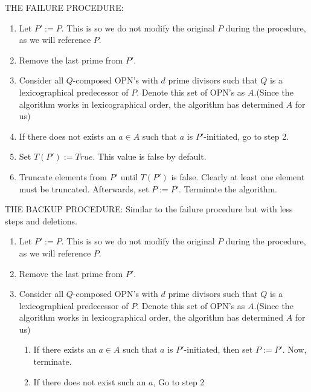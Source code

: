 \documentclass[../paper.tex]{subfiles}
\begin{document}
THE FAILURE PROCEDURE:

\begin{enumerate}[label*=\arabic*.]

  \item Let $P' := P$. This is so we do not modify the original
        $P$ during the procedure, as we will reference $P$.  

  \item Remove the last prime from $P'$.

  \item \label{fail_loop}
        Consider all $Q$-composed OPN's with $d$ prime divisors
such
        that $Q$ is a lexicographical predecessor of $P$. Denote
        this set of OPN's as $A$.(Since the algorithm works in
        lexicographical order, the algorithm has determined $A$
        for us) 

  \item If there does not exists an $a \in A$ such that $a$ is
    $P'$-initiated, go to step 2.

  \item Set $T(P') := True$. This value is false by default.

  \item Truncate elements from $P'$ until $T(P')$ is false.
        Clearly at least one element must be truncated.
        Afterwards, set $P := P'$. Terminate the algorithm.
\end{enumerate}

THE BACKUP PROCEDURE: Similar to the failure procedure but with
less steps and deletions.

\begin{enumerate}[label*=\arabic*.]

  \item Let $P' := P$. This is so we do not modify the original
        $P$ during the procedure, as we will reference $P$.  

  \item Remove the last prime from $P'$.

  \item \label{fail_loop}
        Consider all $Q$-composed OPN's with $d$ prime divisors
such
        that $Q$ is a lexicographical predecessor of $P$. Denote
        this set of OPN's as $A$.(Since the algorithm works in
        lexicographical order, the algorithm has determined $A$
        for us)

  \begin{enumerate}[label*=\arabic*.]

    \item If there exists an $a \in A$ such that $a$ is
    $P'$-initiated, then set $P := P'$. Now, terminate.

    \item If there does not exist such an $a$, Go to step 2

  \end{enumerate}

\end{enumerate}
\end{document}
